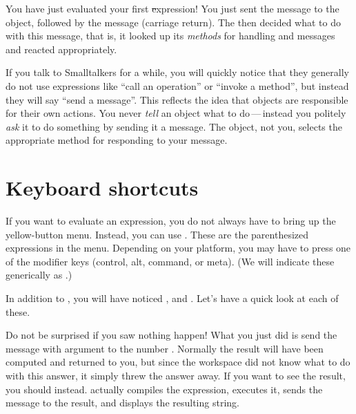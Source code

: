 \documentclass[a4paper,10pt,twoside]{book}
\begin{document}
You have just evaluated your first \st expression!
You just sent the message  to the  object, followed by the message  (carriage return).
The  then decided what to do with this message, that is, it looked up its \emph{methods} for handling  and  messages and reacted appropriately.

If you talk to Smalltalkers for a while, you will quickly notice that they generally do not use expressions like ``call an operation'' or ``invoke a method'', but instead they will say ``send a message''.
This reflects the idea that objects are responsible for their own actions. 
You never \emph{tell} an object what to do\,---\,instead you politely \emph{ask} it to do something by sending it a message. 
The object, not you, selects the appropriate method for responding to your message.


\section{Keyboard shortcuts}

If you want  to evaluate an expression, you do not always have to bring up the yellow-button menu. Instead, you can use . These are the parenthesized expressions in the menu.  Depending on your platform, you may have to press one of the modifier keys (control, alt, command, or meta).
(We will indicate these generically as .)


In addition to , you will have noticed ,  and . Let's have a quick look at each of these.


Do not be surprised if you saw nothing happen! What you just did is send the message \ct{+} with argument  to the number . Normally the result  will have been computed and returned to you, but since the workspace did not know what to do with this answer, it simply threw the answer away.  If you want to see the result, you should  instead.  actually compiles the expression, executes it, sends the message  to the result, and displays the resulting string.
\end{document}
